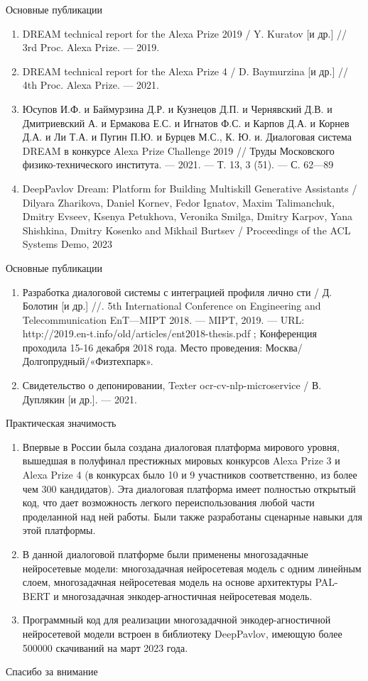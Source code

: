 \begin{frame}{Основные публикации}
\begin{enumerate}
\item DREAM technical report for the Alexa Prize 2019 / Y. Kuratov
[и др.] // 3rd Proc. Alexa Prize. — 2019.
\item DREAM technical report for the Alexa Prize 4  / D. Baymurzina
[и др.] // 4th Proc. Alexa Prize. — 2021.
\item Юсупов И.Ф. и Баймурзина Д.Р. и Кузнецов Д.П. и Чернявский Д.В. и Дмитриевский А. и Ермакова Е.С. и Игнатов Ф.С. и Карпов Д.А. и Корнев Д.А. и Ли Т.А. и Пугин П.Ю. и Бурцев М.С., К. Ю. и. Диалоговая система DREAM в конкурсе Alexa
Prize Challenge 2019 // Труды Московского физико-технического
института. — 2021. — Т. 13, 3 (51). — С. 62—89
\item DeepPavlov Dream: Platform for Building Multiskill Generative Assistants / Dilyara Zharikova, Daniel Kornev, Fedor Ignatov, Maxim Talimanchuk, Dmitry Evseev, Ksenya Petukhova, Veronika Smilga, Dmitry Karpov, Yana Shishkina, Dmitry Kosenko and Mikhail Burtsev / Proceedings of the ACL Systems Demo, 2023
\end{enumerate}
\end{frame}
\begin{frame}{Основные публикации}
\begin{enumerate}
\item Разработка диалоговой системы с интеграцией профиля лично­
сти  / Д. Болотин [и др.] //. 5th International Conference
on Engineering and Telecommunication EnT—MIPT 2018. — MIPT,
2019. — URL: http://2019.en-t.info/old/articles/ent2018-thesis.pdf ;
Конференция проходила 15-16 декабря 2018 года. Место проведения:
Москва/Долгопрудный/«Физтехпарк».
\item Свидетельство о депонировании, Texter ocr-cv-nlp-microservice / В. Дуплякин [и др.]. — 2021.
\end{enumerate}    
\end{frame}


\begin{frame}{Практическая значимость}
\begin{enumerate}
   \item Впервые в России была создана диалоговая платформа мирового уровня, вышедшая в полуфинал престижных мировых конкурсов Alexa Prize 3 и Alexa Prize 4 (в конкурсах было 10 и 9 участников соответственно, из более чем 300 кандидатов). Эта диалоговая платформа имеет полностью открытый код, что дает возможность легкого переиспользования любой части проделанной над ней работы. Были также разработаны сценарные навыки для этой платформы.
   \item В данной диалоговой платформе были применены многозадачные нейросетевые модели: многозадачная нейросетевая модель с одним линейным слоем, многозадачная нейросетевая модель на основе архитектуры PAL-BERT и многозадачная энкодер-агностичная нейросетевая модель.
   \item Программный код для реализации многозадачной энкодер-агностичной нейросетевой модели встроен в библиотеку DeepPavlov, имеющую более 500000 скачиваний на март 2023 года.
\end{enumerate}    
\end{frame}

\begin{frame}{Спасибо за внимание}
\end{frame}


